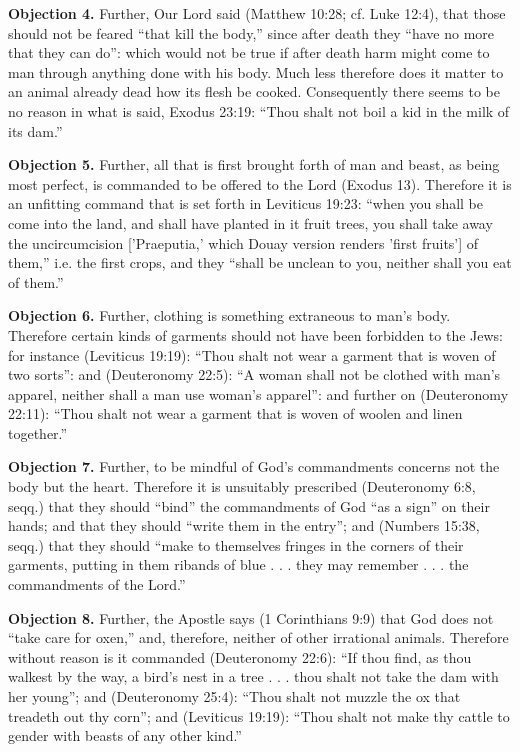 \textbf{Objection 4.} Further, Our Lord said (Matthew 10:28; cf. Luke 12:4), that those should not be feared ``that kill the body,'' since after death they ``have no more that they can do'': which would not be true if after death harm might come to man through anything done with his body. Much less therefore does it matter to an animal already dead how its flesh be cooked. Consequently there seems to be no reason in what is said, Exodus 23:19: ``Thou shalt not boil a kid in the milk of its dam.''

\textbf{Objection 5.} Further, all that is first brought forth of man and beast, as being most perfect, is commanded to be offered to the Lord (Exodus 13). Therefore it is an unfitting command that is set forth in Leviticus 19:23: ``when you shall be come into the land, and shall have planted in it fruit trees, you shall take away the uncircumcision ['Praeputia,' which Douay version renders 'first fruits'] of them,'' i.e. the first crops, and they ``shall be unclean to you, neither shall you eat of them.''

\textbf{Objection 6.} Further, clothing is something extraneous to man's body. Therefore certain kinds of garments should not have been forbidden to the Jews: for instance (Leviticus 19:19): ``Thou shalt not wear a garment that is woven of two sorts'': and (Deuteronomy 22:5): ``A woman shall not be clothed with man's apparel, neither shall a man use woman's apparel'': and further on (Deuteronomy 22:11): ``Thou shalt not wear a garment that is woven of woolen and linen together.''

\textbf{Objection 7.} Further, to be mindful of God's commandments concerns not the body but the heart. Therefore it is unsuitably prescribed (Deuteronomy 6:8, seqq.) that they should ``bind'' the commandments of God ``as a sign'' on their hands; and that they should ``write them in the entry''; and (Numbers 15:38, seqq.) that they should ``make to themselves fringes in the corners of their garments, putting in them ribands of blue . . . they may remember . . . the commandments of the Lord.''

\textbf{Objection 8.} Further, the Apostle says (1 Corinthians 9:9) that God does not ``take care for oxen,'' and, therefore, neither of other irrational animals. Therefore without reason is it commanded (Deuteronomy 22:6): ``If thou find, as thou walkest by the way, a bird's nest in a tree . . . thou shalt not take the dam with her young''; and (Deuteronomy 25:4): ``Thou shalt not muzzle the ox that treadeth out thy corn''; and (Leviticus 19:19): ``Thou shalt not make thy cattle to gender with beasts of any other kind.''

